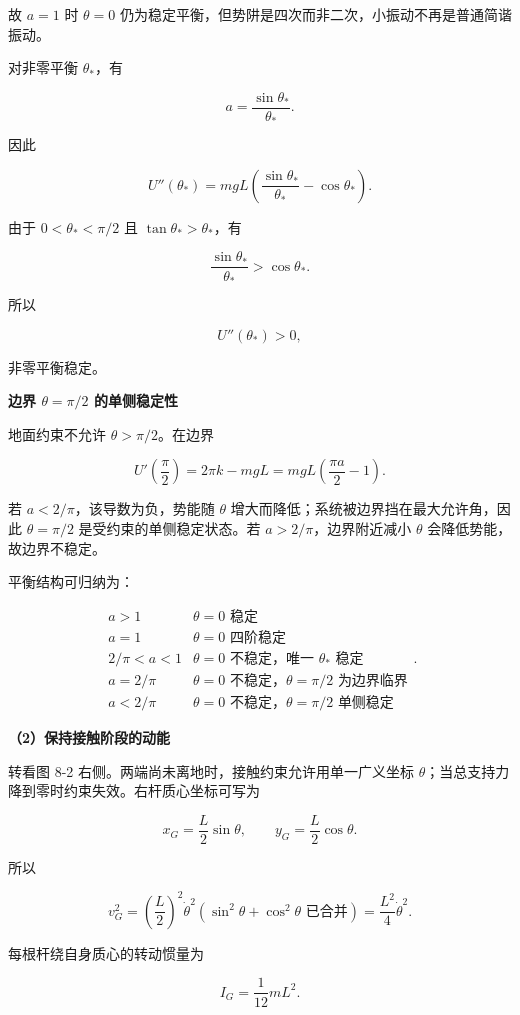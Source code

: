 \documentclass[12pt,a4paper,UTF8]{ctexart}
\begin{document}
故 \(a=1\) 时 \(\theta=0\)
仍为稳定平衡，但势阱是四次而非二次，小振动不再是普通简谐振动。

对非零平衡 \(\theta_*\)，有

\[a=\frac{\sin\theta_*}{\theta_*}.\]

因此

\[U''(\theta_*)=mgL\left(\frac{\sin\theta_*}{\theta_*}-\cos\theta_*\right).\]

由于 \(0<\theta_*<\pi/2\) 且 \(\tan\theta_*>\theta_*\)，有

\[\frac{\sin\theta_*}{\theta_*}>\cos\theta_*.\]

所以

\[\boxed{U''(\theta_*)>0},\]

非零平衡稳定。

\textbf{边界 \(\theta=\pi/2\) 的单侧稳定性}

地面约束不允许 \(\theta>\pi/2\)。在边界

\[U'\left(\frac\pi2\right)=2\pi k-mgL
=mgL\left(\frac{\pi a}{2}-1\right).\]

若 \(a<2/\pi\)，该导数为负，势能随 \(\theta\)
增大而降低；系统被边界挡在最大允许角，因此 \(\theta=\pi/2\)
是受约束的单侧稳定状态。若 \(a>2/\pi\)，边界附近减小 \(\theta\)
会降低势能，故边界不稳定。

平衡结构可归纳为：

\[\boxed{
\begin{array}{c|c}
a>1 & \theta=0\text{ 稳定}\\
a=1 & \theta=0\text{ 四阶稳定}\\
2/\pi<a<1 & \theta=0\text{ 不稳定，唯一 }\theta_*\text{ 稳定}\\
a=2/\pi & \theta=0\text{ 不稳定，}\theta=\pi/2\text{ 为边界临界}\\
a<2/\pi & \theta=0\text{ 不稳定，}\theta=\pi/2\text{ 单侧稳定}
\end{array}
}.\]

\textbf{（2）保持接触阶段的动能}

转看图 8-2 右侧。两端尚未离地时，接触约束允许用单一广义坐标
\(\theta\)；当总支持力降到零时约束失效。右杆质心坐标可写为

\[x_G=\frac L2\sin\theta,\qquad y_G=\frac L2\cos\theta.\]

所以

\[v_G^2=\left(\frac L2\right)^2\dot\theta^2
(\sin^2\theta+\cos^2\theta\text{ 已合并})
=\frac{L^2}{4}\dot\theta^2.\]

每根杆绕自身质心的转动惯量为

\[I_G=\frac1{12}mL^2.\]
\end{document}
